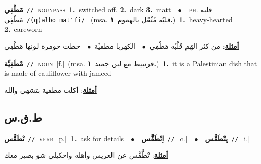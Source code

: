 \documentclass[10pt,a4paper,twoside]{article} %
\begin{document}
\begin{multicols}{2}
{\setlength\topsep{0pt}\textbf{\foreignlanguage{arabic}{مَطْفِي}}\ {\color{gray}\texttt{//}\color{black}}\ \textsc{noun\textunderscore pass}\ \textbf{1.}~switched off.  \textbf{2.}~dark  \textbf{3.}~matt\ \ $\bullet$\ \ \textsc{ph.} \color{gray} \foreignlanguage{arabic}{قلبه مَطْفِي}\color{black}\ {\color{gray}\texttt{/{\sffamily (q)albo matˤfi}/}\color{black}}\ \color{gray} (msa. \foreignlanguage{arabic}{قلبُه مُثْقَل بالهموم}~\foreignlanguage{arabic}{\textbf{١.}})\color{black}\ \textbf{1.}~heavy-hearted  \textbf{2.}~careworn\  \begin{flushright}\color{gray}\foreignlanguage{arabic}{\textbf{\underline{\foreignlanguage{arabic}{أمثلة}}}: من كثر الهَم قَلْبُه مَطْفِي\ $\bullet$\ \  الكهربا مطفيِّة\ $\bullet$\ \  حطت حومرة لونها مَطْفِي}\end{flushright}\color{black}} \vspace{2mm}

{\setlength\topsep{0pt}\textbf{\foreignlanguage{arabic}{مْطَفِيِّة}}\ {\color{gray}\texttt{//}\color{black}}\ \textsc{noun}\ [f.]\ \color{gray}(msa. \foreignlanguage{arabic}{قرنبيط مع لبن جميد}~\foreignlanguage{arabic}{\textbf{١.}})\color{black}\ \textbf{1.}~it is a Palestinian dish that is made of cauliflower with jameed\  \begin{flushright}\color{gray}\foreignlanguage{arabic}{\textbf{\underline{\foreignlanguage{arabic}{أمثلة}}}: أكلت مطفية بتشهي والله}\end{flushright}\color{black}} \vspace{2mm}

\vspace{-3mm}
\subsection*{\color{blue}\foreignlanguage{arabic}{ط.ق.س}\color{blue}{}} 

{\setlength\topsep{0pt}\textbf{\foreignlanguage{arabic}{تْطَقَّس}}\ {\color{gray}\texttt{//}\color{black}}\ \textsc{verb}\ [p.]\ \textbf{1.}~ask for details\ \ $\bullet$\ \ \setlength\topsep{0pt}\textbf{\foreignlanguage{arabic}{اِتْطَقَّس}}\ {\color{gray}\texttt{//}\color{black}}\ [c.]\ \ $\bullet$\ \ \setlength\topsep{0pt}\textbf{\foreignlanguage{arabic}{يِتْطَقَّس}}\ {\color{gray}\texttt{//}\color{black}}\ [i.]\  \begin{flushright}\color{gray}\foreignlanguage{arabic}{\textbf{\underline{\foreignlanguage{arabic}{أمثلة}}}: تْطَّقَّس عن العريس وأهله واحكيلي شو بصير معك}\end{flushright}\color{black}} \vspace{2mm}


\end{multicols}
\end{document}
